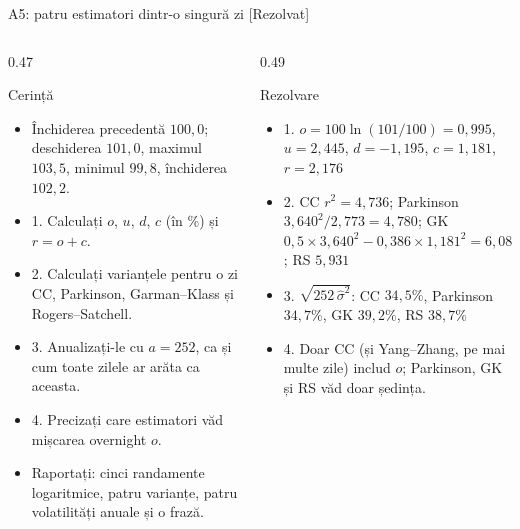 \begin{frame}{A5: patru estimatori dintr-o singură zi [Rezolvat]}
\itemsize{\scriptsize}
\begin{columns}[T]
\begin{column}{0.47\textwidth}
\begin{block}{Cerință}
\begin{itemize}
    \item Închiderea precedentă $100{,}0$; deschiderea $101{,}0$, maximul $103{,}5$, minimul $99{,}8$, închiderea $102{,}2$.
    \item 1. Calculați $o$, $u$, $d$, $c$ (în \%) și $r = o + c$.
    \item 2. Calculați varianțele pentru o zi CC, Parkinson, Garman--Klass și Rogers--Satchell.
    \item 3. Anualizați-le cu $a = 252$, ca și cum toate zilele ar arăta ca aceasta.
    \item 4. Precizați care estimatori văd mișcarea overnight $o$.
    \item Raportați: cinci randamente logaritmice, patru varianțe, patru volatilități anuale și o frază.
\end{itemize}
\end{block}
\end{column}
\begin{column}{0.49\textwidth}
\begin{exampleblock}{Rezolvare}
\begin{itemize}
    \item 1. $o = 100\ln(101/100) = 0{,}995$, $u = 2{,}445$, $d = -1{,}195$, $c = 1{,}181$, $r = 2{,}176$
    \item 2. CC $r^2 = 4{,}736$; Parkinson $3{,}640^2/2{,}773 = 4{,}780$; GK $0{,}5 \times 3{,}640^2 - 0{,}386 \times 1{,}181^2 = 6{,}087$; RS $5{,}931$
    \item 3. $\sqrt{252\,\hat\sigma^2}$: CC $34{,}5\%$, Parkinson $34{,}7\%$, GK $39{,}2\%$, RS $38{,}7\%$
    \item 4. Doar CC (și Yang--Zhang, pe mai multe zile) includ $o$; Parkinson, GK și RS văd doar ședința.
\end{itemize}
\end{exampleblock}
\end{column}
\end{columns}
\end{frame}

